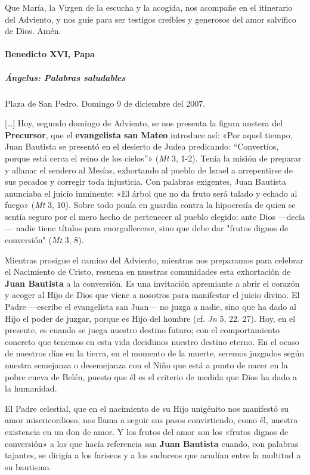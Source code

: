 \documentclass[]{article}
\let\oldparagraph\paragraph
\renewcommand{\paragraph}[1]{\oldparagraph{#1}\mbox{}}
\let\oldsubparagraph\subparagraph
\renewcommand{\subparagraph}[1]{\oldsubparagraph{#1}\mbox{}}
\begin{document}
Que María, la Virgen de la escucha y la acogida, nos acompañe en el
itinerario del Adviento, y nos guíe para ser testigos creíbles y
generosos del amor salvífico de Dios. Amén.

\paragraph{Benedicto XVI, Papa}\label{benedicto-xvi-papa-1}

\subparagraph{Ángelus: Palabras
saludables}\label{uxe1ngelus-palabras-saludables}

Plaza de San Pedro.  Domingo 9 de diciembre del 2007.

[\ldots{}] Hoy, segundo domingo de Adviento, se nos presenta la figura
austera del \textbf{Precursor}, que el \textbf{evangelista san Mateo}
introduce así: «Por aquel tiempo, Juan Bautista se presentó en el
desierto de Judea predicando: ``Convertíos, porque está cerca el reino
de los cielos''» (\emph{Mt} 3, 1-2). Tenía la misión de preparar y
allanar el sendero al Mesías, exhortando al pueblo de Israel a
arrepentirse de sus pecados y corregir toda injusticia. Con palabras
exigentes, Juan Bautista anunciaba el juicio inminente: «El árbol que no
da fruto será talado y echado al fuego» (\emph{Mt} 3, 10). Sobre todo
ponía en guardia contra la hipocresía de quien se sentía seguro por el
mero hecho de pertenecer al pueblo elegido: ante Dios ---decía--- nadie
tiene títulos para enorgullecerse, sino que debe dar "frutos dignos de
conversión" (\emph{Mt} 3, 8).

Mientras prosigue el camino del Adviento, mientras nos preparamos para
celebrar el Nacimiento de Cristo, resuena en nuestras comunidades esta
exhortación de \textbf{Juan Bautista} a la conversión. Es una invitación
apremiante a abrir el corazón y acoger al Hijo de Dios que viene a
nosotros para manifestar el juicio divino. El Padre ---escribe el
evangelista san Juan--- no juzga a nadie, sino que ha dado al Hijo el
poder de juzgar, porque es Hijo del hombre (cf. \emph{Jn} 5, 22. 27).
Hoy, en el presente, es cuando se juega nuestro destino futuro; con el
comportamiento concreto que tenemos en esta vida decidimos nuestro
destino eterno. En el ocaso de nuestros días en la tierra, en el momento
de la muerte, seremos juzgados según nuestra semejanza o desemejanza con
el Niño que está a punto de nacer en la pobre cueva de Belén, puesto que
él es el criterio de medida que Dios ha dado a la humanidad.

El Padre celestial, que en el nacimiento de su Hijo unigénito nos
manifestó su amor misericordioso, nos llama a seguir sus pasos
convirtiendo, como él, nuestra existencia en un don de amor. Y los
frutos del amor son los «frutos dignos de conversión» a los que hacía
referencia san \textbf{Juan Bautista} cuando, con palabras tajantes, se
dirigía a los fariseos y a los saduceos que acudían entre la multitud a
su bautismo.
\end{document}
